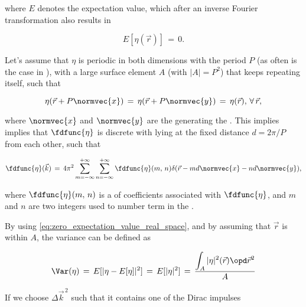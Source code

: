 {where $E$ denotes the expectation value, which after an inverse Fourier transformation also results in 

\begin{equation} \label{eq:zero_expectation_value_real_space}
E[\eta(\vec{r})] \,=\, 0.
\end{equation}

Let's assume that $\eta$ is periodic in both dimensions with the period $P$ (as often is the case in ), with a large surface element $A$ (with \mbox{$|A| = P^2$}) that keeps repeating itself, such that

\begin{equation} \label{eq:water_surface_periodicity}
\eta(\vec{r}+P\normvec{x}) \,=\, \eta(\vec{r}+P\normvec{y}) \,=\, \eta(\vec{r}),\,\forall\,\vec{r},
\end{equation}

where $\normvec{x}$ and $\normvec{y}$ are the  generating the . This implies implies that $\fdfunc{\eta}$ is discrete with  lying at the fixed distance $d = 2\pi/P$ from each other, such that

\begin{equation}
\fdfunc{\eta}(\vec{k}) \,=\, 4\pi^2\sum_{m=-\infty}^{+\infty}\sum_{n=-\infty}^{+\infty} \fdfunc{\eta}(m,\,n)\delta(\vec{r} - md\normvec{x} - nd\normvec{y}),
\end{equation}

where $\fdfunc{\eta}(m,\,n)$ is a \twodimensional \sequence of coefficients associated with $\fdfunc{\eta}$, and $m$ and $n$ are two integers used to number term in the \series.

By using \eqref{eq:zero_expectation_value_real_space}, and by assuming that $\vec{r}$ is  within $A$, the variance can be defined as

\begin{equation}
\Var(\eta) \,=\, E[|\eta - E[\eta]|^2] \,=\, E[|\eta|^2] \,=\, \frac{\displaystyle \int_A|\eta|^2(\vec{r})\opd\vec{r}^2}{A}
\end{equation}

\HRule

If we choose $\Delta\vec{k}^{\,2}$ such that it contains one of the Dirac impulses


















}
